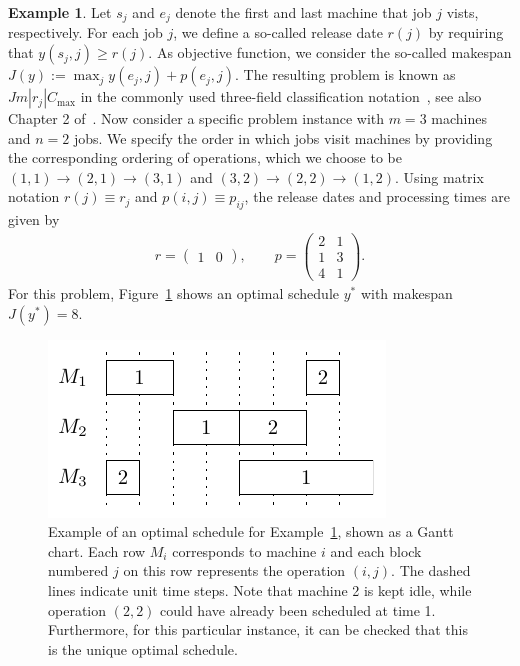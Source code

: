 \documentclass[a4paper]{report}
\theoremstyle{definition}
\newtheorem{eg}{Example}
\theoremstyle{plain}
\begin{document}
\begin{eg}\label{eg:job-shop}
  Let $s_{j}$ and $e_{j}$ denote the first and last machine that job $j$ vists, respectively.
  For each job $j$, we define a so-called release date $r(j)$ by requiring that
  $y(s_{j},j) \geq r(j)$.
  As objective function, we consider the so-called makespan
  $J(y) := \max_{j} y(e_{j},j) + p(e_{j}, j)$.
  The resulting problem is known as $Jm|r_{j}|C_{\max}$ in the commonly
  used three-field classification
  notation~\cite{grahamOptimizationApproximationDeterministic1979}, see also
  Chapter 2 of~\cite{pinedoSchedulingTheoryAlgorithms2016}.
  Now consider a specific problem instance with $m=3$ machines and $n=2$ jobs.
  We specify the order in which jobs visit machines by providing the
  corresponding ordering of operations, which we choose to be
  $(1,1) \rightarrow (2,1) \rightarrow (3,1)$ and $(3,2) \rightarrow (2,2) \rightarrow (1,2)$. Using matrix notation
  $r(j) \equiv r_{j}$ and $p(i,j) \equiv p_{ij}$, the release dates and processing
  times are given by
  \begin{align*}
    r =
    \begin{pmatrix}
      1 & 0
    \end{pmatrix} ,
    \quad\quad
    p =
    \begin{pmatrix}
      2 & 1 \\
      1 & 3 \\
      4 & 1
    \end{pmatrix} .
  \end{align*}
  For this problem, Figure~\ref{fig:job-shop-delay} shows an optimal schedule $y^{*}$ with
  makespan $J(y^{*}) = 8$.
\end{eg}

\begin{figure}
  \centering
  \includegraphics[scale=1]{figures/job-shop-delay.pdf}
  \caption{Example of an optimal schedule for Example~\ref{eg:job-shop}, shown
    as a Gantt chart. Each row $M_{i}$ corresponds to machine $i$ and each block
    numbered $j$ on this row represents the operation $(i,j)$. The dashed lines
    indicate unit time steps. Note that machine 2 is kept idle, while operation
    $(2,2)$ could have already been scheduled at time 1. Furthermore, for this
    particular instance, it can be checked that this is the unique optimal
    schedule.}
  \label{fig:job-shop-delay}
\end{figure}
\end{document}
